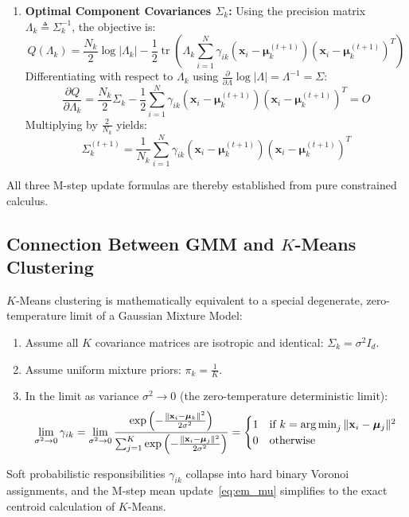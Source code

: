 \begin{enumerate}
    \item \textbf{Optimal Component Covariances $\Sigma_k$:}
    Using the precision matrix $\Lambda_k \triangleq \Sigma_k^{-1}$, the objective is:
    \begin{equation}
    Q(\Lambda_k) = \frac{N_k}{2}\log|\Lambda_k| - \frac{1}{2}\operatorname{tr}\left( \Lambda_k \sum_{i=1}^N \gamma_{ik}(\mathbf{x}_i - \boldsymbol{\mu}_k^{(t+1)})(\mathbf{x}_i - \boldsymbol{\mu}_k^{(t+1)})^T \right)
    \end{equation}
    Differentiating with respect to $\Lambda_k$ using $\frac{\partial}{\partial \Lambda}\log|\Lambda| = \Lambda^{-1} = \Sigma$:
    \begin{equation}
    \frac{\partial Q}{\partial \Lambda_k} = \frac{N_k}{2}\Sigma_k - \frac{1}{2}\sum_{i=1}^N \gamma_{ik}(\mathbf{x}_i - \boldsymbol{\mu}_k^{(t+1)})(\mathbf{x}_i - \boldsymbol{\mu}_k^{(t+1)})^T = O
    \end{equation}
    Multiplying by $\frac{2}{N_k}$ yields:
    \begin{equation}
    \Sigma_k^{(t+1)} = \frac{1}{N_k}\sum_{i=1}^N \gamma_{ik}(\mathbf{x}_i - \boldsymbol{\mu}_k^{(t+1)})(\mathbf{x}_i - \boldsymbol{\mu}_k^{(t+1)})^T
    \end{equation}
\end{enumerate}
All three M-step update formulas are thereby established from pure constrained calculus.

\subsection{Connection Between GMM and \texorpdfstring{$K$}{K}-Means Clustering}
$K$-Means clustering is mathematically equivalent to a special degenerate, zero-temperature limit of a Gaussian Mixture Model:
\begin{enumerate}
    \item Assume all $K$ covariance matrices are isotropic and identical: $\Sigma_k = \sigma^2 I_d$.
    \item Assume uniform mixture priors: $\pi_k = \frac{1}{K}$.
    \item In the limit as variance $\sigma^2 \to 0$ (the zero-temperature deterministic limit):
    \begin{equation}
    \lim_{\sigma^2 \to 0} \gamma_{ik} = \lim_{\sigma^2 \to 0} \frac{\exp\left( -\frac{\|\mathbf{x}_i - \boldsymbol{\mu}_k\|^2}{2\sigma^2} \right)}{\sum_{j=1}^K \exp\left( -\frac{\|\mathbf{x}_i - \boldsymbol{\mu}_j\|^2}{2\sigma^2} \right)} = \begin{cases} 1 & \text{if } k = \operatorname*{arg\,min}_j \|\mathbf{x}_i - \boldsymbol{\mu}_j\|^2 \\ 0 & \text{otherwise} \end{cases}
    \end{equation}
\end{enumerate}
Soft probabilistic responsibilities $\gamma_{ik}$ collapse into hard binary Voronoi assignments, and the M-step mean update~\eqref{eq:em_mu} simplifies to the exact centroid calculation of $K$-Means.

